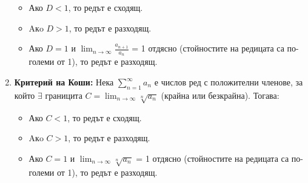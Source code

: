 \documentclass[11pt,oneside,a4paper]{article}
\begin{document}
\begin{enumerate}
    \begin{itemize}
        \item Ако \(D < 1\), то редът е сходящ.
        \item Aкo \(D > 1\), то редът е разходящ.
        \item Ако \(D = 1\) и \(\displaystyle \lim_{n \to \infty} \frac{a_{n+1}}{a_n}\) = 1 отдясно (стойностите на редицата са по-големи от 1), то редът е разходящ.
    \end{itemize}
    \item \textbf{Критерий на Коши: } Нека \(\displaystyle \sum_{n=1}^{\infty} a_n\) е числов ред с положителни членове, за който \(\exists\) границита \(C = \displaystyle \lim_{n \to \infty} \sqrt[n]{a_n}\) (крайна или безкрайна). Тогава: 
    \begin{itemize}
        \item Ако \(C < 1\), то редът е сходящ.
        \item Aкo \(C > 1\), то редът е разходящ.
        \item Ако \(C = 1\) и \(\displaystyle \lim_{n \to \infty} \sqrt[n]{a_n}\) = 1 отдясно (стойностите на редицата са по-големи от 1), то редът е разходящ.
    \end{itemize}
\end{enumerate}
\end{document}
